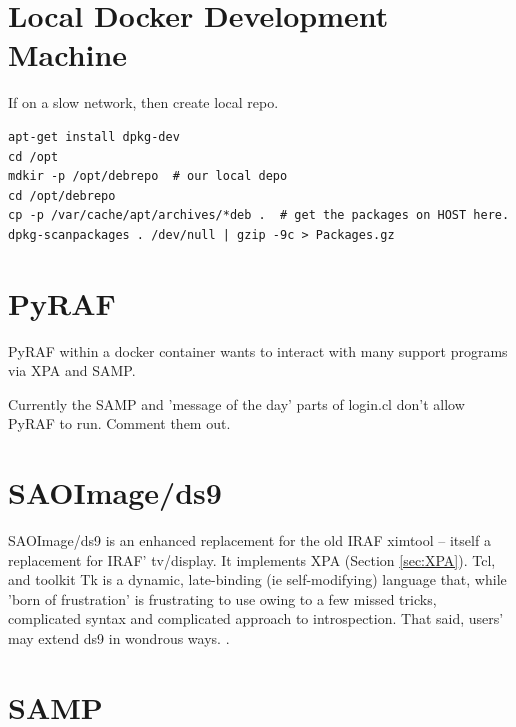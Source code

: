 \documentclass[letter,11pt,oneside]{article}
\begin{document}
\section{Local Docker Development Machine}

If on a slow network, then create local repo.


\begin{tcolorbox}
\begingroup \fontsize{10pt}{10pt}
\selectfont
\begin{verbatim} 
apt-get install dpkg-dev
cd /opt
mdkir -p /opt/debrepo  # our local depo
cd /opt/debrepo
cp -p /var/cache/apt/archives/*deb .  # get the packages on HOST here.
dpkg-scanpackages . /dev/null | gzip -9c > Packages.gz
\end{verbatim}
\endgroup
\end{tcolorbox}

\section{PyRAF}

PyRAF within a docker container wants to interact with many support
programs via XPA and SAMP.  
 


Currently the SAMP and 'message of the day' parts of login.cl
don't allow PyRAF to run. Comment them out.

\section{SAOImage/ds9}

SAOImage/ds9 is an enhanced replacement for the old IRAF ximtool --
itself a replacement for IRAF' tv/display. It implements XPA (Section
\ref{sec:XPA}). Tcl, and toolkit Tk is a dynamic, late-binding (ie
self-modifying) language that, while 'born of frustration' is
frustrating to use owing to a few missed tricks, complicated syntax
and complicated approach to introspection. That said, users' may
extend ds9 in wondrous ways. .


\section{SAMP}
\end{document}
